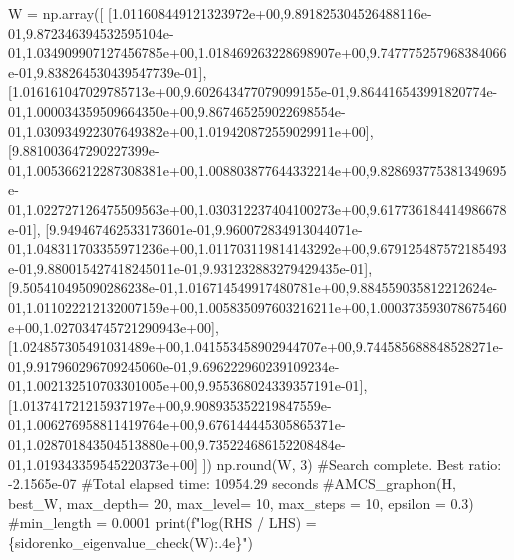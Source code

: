 \documentclass[
  letterpaper,
  DIV=11,
  numbers=noendperiod]{scrartcl}
\newenvironment{Shaded}{\begin{snugshade}}{\end{snugshade}}
\newcommand{\BuiltInTok}[1]{\textcolor[rgb]{0.00,0.23,0.31}{#1}}
\newcommand{\CommentTok}[1]{\textcolor[rgb]{0.37,0.37,0.37}{#1}}
\newcommand{\DecValTok}[1]{\textcolor[rgb]{0.68,0.00,0.00}{#1}}
\newcommand{\FloatTok}[1]{\textcolor[rgb]{0.68,0.00,0.00}{#1}}
\newcommand{\NormalTok}[1]{\textcolor[rgb]{0.00,0.23,0.31}{#1}}
\newcommand{\OperatorTok}[1]{\textcolor[rgb]{0.37,0.37,0.37}{#1}}
\newcommand{\SpecialCharTok}[1]{\textcolor[rgb]{0.37,0.37,0.37}{#1}}
\newcommand{\SpecialStringTok}[1]{\textcolor[rgb]{0.13,0.47,0.30}{#1}}
\begin{document}
\begin{Shaded}
\begin{Highlighting}[]
\NormalTok{W }\OperatorTok{=}\NormalTok{ np.array([}
\NormalTok{[}\FloatTok{1.011608449121323972e+00}\NormalTok{,}\FloatTok{9.891825304526488116e{-}01}\NormalTok{,}\FloatTok{9.872346394532595104e{-}01}\NormalTok{,}\FloatTok{1.034909907127456785e+00}\NormalTok{,}\FloatTok{1.018469263228698907e+00}\NormalTok{,}\FloatTok{9.747775257968384066e{-}01}\NormalTok{,}\FloatTok{9.838264530439547739e{-}01}\NormalTok{],}
\NormalTok{[}\FloatTok{1.016161047029785713e+00}\NormalTok{,}\FloatTok{9.602643477079099155e{-}01}\NormalTok{,}\FloatTok{9.864416543991820774e{-}01}\NormalTok{,}\FloatTok{1.000034359509664350e+00}\NormalTok{,}\FloatTok{9.867465259022698554e{-}01}\NormalTok{,}\FloatTok{1.030934922307649382e+00}\NormalTok{,}\FloatTok{1.019420872559029911e+00}\NormalTok{],}
\NormalTok{[}\FloatTok{9.881003647290227399e{-}01}\NormalTok{,}\FloatTok{1.005366212287308381e+00}\NormalTok{,}\FloatTok{1.008803877644332214e+00}\NormalTok{,}\FloatTok{9.828693775381349695e{-}01}\NormalTok{,}\FloatTok{1.022727126475509563e+00}\NormalTok{,}\FloatTok{1.030312237404100273e+00}\NormalTok{,}\FloatTok{9.617736184414986678e{-}01}\NormalTok{],}
\NormalTok{[}\FloatTok{9.949467462533173601e{-}01}\NormalTok{,}\FloatTok{9.960072834913044071e{-}01}\NormalTok{,}\FloatTok{1.048311703355971236e+00}\NormalTok{,}\FloatTok{1.011703119814143292e+00}\NormalTok{,}\FloatTok{9.679125487572185493e{-}01}\NormalTok{,}\FloatTok{9.880015427418245011e{-}01}\NormalTok{,}\FloatTok{9.931232883279429435e{-}01}\NormalTok{],}
\NormalTok{[}\FloatTok{9.505410495090286238e{-}01}\NormalTok{,}\FloatTok{1.016714549917480781e+00}\NormalTok{,}\FloatTok{9.884559035812212624e{-}01}\NormalTok{,}\FloatTok{1.011022212132007159e+00}\NormalTok{,}\FloatTok{1.005835097603216211e+00}\NormalTok{,}\FloatTok{1.000373593078675460e+00}\NormalTok{,}\FloatTok{1.027034745721290943e+00}\NormalTok{],}
\NormalTok{[}\FloatTok{1.024857305491031489e+00}\NormalTok{,}\FloatTok{1.041553458902944707e+00}\NormalTok{,}\FloatTok{9.744585688848528271e{-}01}\NormalTok{,}\FloatTok{9.917960296709245060e{-}01}\NormalTok{,}\FloatTok{9.696222960239109234e{-}01}\NormalTok{,}\FloatTok{1.002132510703301005e+00}\NormalTok{,}\FloatTok{9.955368024339357191e{-}01}\NormalTok{],}
\NormalTok{[}\FloatTok{1.013741721215937197e+00}\NormalTok{,}\FloatTok{9.908935352219847559e{-}01}\NormalTok{,}\FloatTok{1.006276958811419764e+00}\NormalTok{,}\FloatTok{9.676144445305865371e{-}01}\NormalTok{,}\FloatTok{1.028701843504513880e+00}\NormalTok{,}\FloatTok{9.735224686152208484e{-}01}\NormalTok{,}\FloatTok{1.019343359545220373e+00}\NormalTok{]}
\NormalTok{])}
\NormalTok{np.}\BuiltInTok{round}\NormalTok{(W, }\DecValTok{3}\NormalTok{)}
\CommentTok{\#Search complete. Best ratio: {-}2.1565e{-}07}
\CommentTok{\#Total elapsed time: 10954.29 seconds}
\CommentTok{\#AMCS\_graphon(H, best\_W, max\_depth= 20, max\_level= 10, max\_steps = 10, epsilon = 0.3)}
\CommentTok{\#min\_length = 0.0001}
\BuiltInTok{print}\NormalTok{(}\SpecialStringTok{f"log(RHS / LHS) = }\SpecialCharTok{\{}\NormalTok{sidorenko\_eigenvalue\_check(W)}\SpecialCharTok{:.4e\}}\SpecialStringTok{"}\NormalTok{)}


\end{Highlighting}
\end{Shaded}
\end{document}
